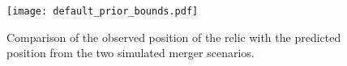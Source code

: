 \begin{figure}
	\texttt{[image: default\_prior\_bounds.pdf]}
	\caption{Comparison of the observed position of the relic with the
	predicted position from the two simulated merger scenarios.
	\label{defaultprior_bounds}}
\end{figure}
